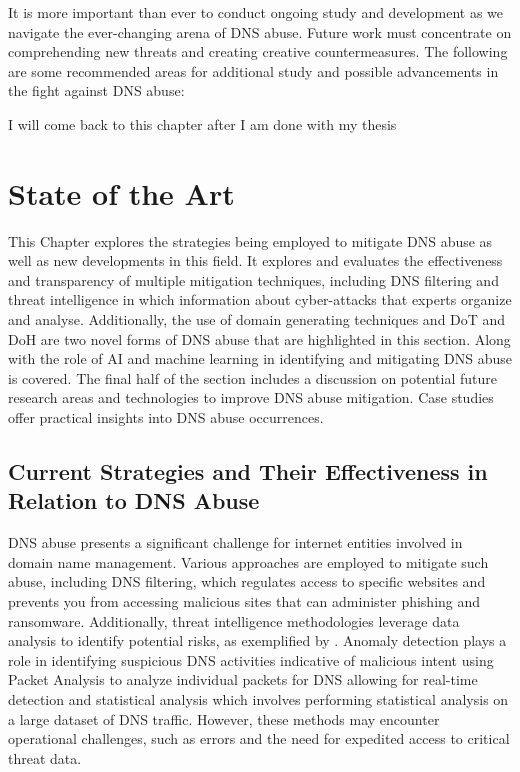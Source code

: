 It is more important than ever to conduct ongoing study and development as we navigate the ever-changing arena of DNS abuse. Future work must concentrate on comprehending new threats and creating creative countermeasures. The following are some recommended areas for additional study and possible advancements in the fight against DNS abuse:

I will come back to this chapter after I am done with my thesis 

\chapter{State of the Art}

This Chapter explores the strategies being employed to mitigate DNS abuse as well as new developments in this field. It explores and evaluates the effectiveness and transparency of multiple mitigation techniques, including DNS filtering and threat intelligence in which information about cyber-attacks that experts organize and analyse. Additionally, the use of domain generating techniques and DoT and DoH are two novel forms of DNS abuse that are highlighted in this section. Along with the role of AI and machine learning in identifying and mitigating DNS abuse is covered. The final half of the section includes a discussion on potential future research areas and technologies to improve DNS abuse mitigation. Case studies offer practical insights into DNS abuse occurrences. 

\section{Current Strategies and Their Effectiveness in Relation to DNS Abuse}

DNS abuse presents a significant challenge for internet entities involved in domain name management. Various approaches are employed to mitigate such abuse, including DNS filtering, which regulates access to specific websites and prevents you from accessing malicious sites that can administer phishing and ransomware. Additionally, threat intelligence methodologies leverage data analysis to identify potential risks, as exemplified by \cite{schmid2021thirty}. Anomaly detection plays a role in identifying suspicious DNS activities indicative of malicious intent using Packet Analysis to analyze individual packets for DNS allowing for real-time detection and statistical analysis which involves performing statistical analysis on a large dataset of DNS traffic. However, these methods may encounter operational challenges, such as errors and the need for expedited access to critical threat data. 

